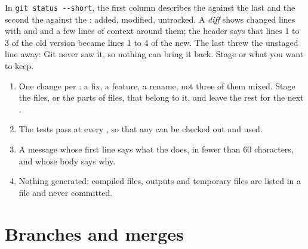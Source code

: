 \label{out:b1:version-control:staging}

In \texttt{git status -{}-{}short}, the first column describes the  against the last  and the second the
 against the :  added,  modified,  untracked. A
\emph{diff} shows changed lines with \code{-} and \code{+} and a few lines of context around them; the header
 says that lines 1 to 3 of the old version became lines 1 to 4 of the new. The last
 threw the unstaged line away: Git never saw it, so nothing can bring it back. Stage or 
what you want to keep.

\begin{method}\label{met:b1:version-control:good-commit}
\begin{enumerate}
\item One change per : a fix, a feature, a rename, not three of them mixed. Stage the files, or the parts of
files, that belong to it, and leave the rest for the next .
\item The tests pass at every , so that any  can be checked out and used.
\item A message whose first line says what the  does, in fewer than 60 characters, and whose body says why.
\item Nothing generated: compiled files, outputs and temporary files are listed in a file  and never
committed.
\end{enumerate}
\end{method}

\section{Branches and merges}\label{sec:b1:version-control:branches}


